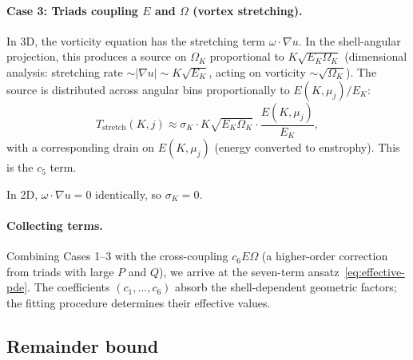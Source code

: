 \documentclass[11pt,a4paper]{article}
\theoremstyle{remark}
\begin{document}
\paragraph{Case 3: Triads coupling $E$ and $\Omega$ (vortex stretching).}
In 3D, the vorticity equation has the stretching term $\omega \cdot \nabla u$.  In the shell-angular projection, this produces a source on $\Omega_K$ proportional to $K\sqrt{E_K \Omega_K}$ (dimensional analysis: stretching rate $\sim |\nabla u| \sim K\sqrt{E_K}$, acting on vorticity $\sim \sqrt{\Omega_K}$).  The source is distributed across angular bins proportionally to $E(K, \mu_j)/E_K$:
\[
  T_{\mathrm{stretch}}(K, j) \approx \sigma_K \cdot K\sqrt{E_K \Omega_K} \cdot \frac{E(K, \mu_j)}{E_K},
\]
with a corresponding drain on $E(K, \mu_j)$ (energy converted to enstrophy).  This is the $c_5$ term.

In 2D, $\omega \cdot \nabla u = 0$ identically, so $\sigma_K = 0$.

\paragraph{Collecting terms.}
Combining Cases 1--3 with the cross-coupling $c_6 E \Omega$ (a higher-order correction from triads with large $P$ and $Q$), we arrive at the seven-term ansatz~\eqref{eq:effective-pde}.  The coefficients $(c_1, \ldots, c_6)$ absorb the shell-dependent geometric factors; the fitting procedure determines their effective values.

\subsection{Remainder bound}\label{sec:remainder}
\end{document}
